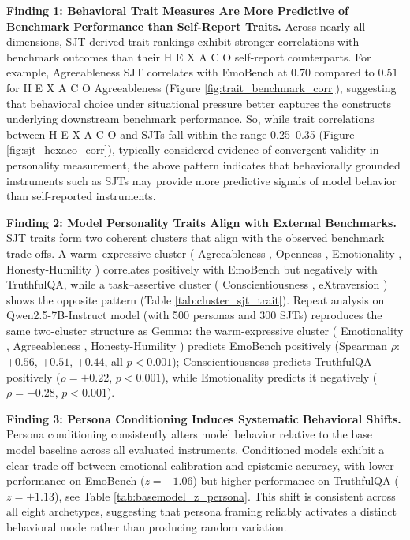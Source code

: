 \documentclass[11pt]{article}
\newcommand{\hexaco}{%
  {\textcolor{hexH}{H}}%
  {\textcolor{hexE}{E}}%
  {\textcolor{hexX}{X}}%
  {\textcolor{hexA}{A}}%
  {\textcolor{hexC}{C}}%
  {\textcolor{hexO}{O}}%
}
\newcommand{\honestyhumility}{%
  {\textcolor{hexH}{Honesty-Humility}}%
}
\newcommand{\emotionality}{%
  {\textcolor{hexE}{Emotionality}}%
}
\newcommand{\extraversion}{%
  {\textcolor{hexX}{eXtraversion}}%
}
\newcommand{\agreeableness}{%
  {\textcolor{hexA}{Agreeableness}}%
}
\newcommand{\conscientiousness}{%
  {\textcolor{hexC}{Conscientiousness}}%
}
\newcommand{\openness}{%
  {\textcolor{hexO}{Openness}}%
}
\begin{document}
\noindent\textbf{Finding 1: Behavioral Trait Measures Are More Predictive of Benchmark Performance than Self-Report Traits.}
Across nearly all dimensions, SJT-derived trait rankings exhibit stronger correlations with benchmark outcomes than their \hexaco\; self-report counterparts. For example, \agreeableness\; SJT correlates with EmoBench at $0.70$ compared to $0.51$ for \hexaco\; \agreeableness\; (Figure \ref{fig:trait_benchmark_corr}), suggesting that behavioral choice under situational pressure better captures the constructs underlying downstream benchmark performance. So, while trait correlations between \hexaco\; and SJTs fall within the range 0.25–0.35 (Figure \ref{fig:sjt_hexaco_corr}), typically considered evidence of convergent validity in personality measurement, the above pattern indicates that behaviorally grounded instruments such as SJTs may provide more predictive signals of model behavior than self-reported instruments.

\noindent\textbf{Finding 2: Model Personality Traits Align with External Benchmarks.}
SJT traits form two coherent clusters that align with the observed benchmark trade-offs. A warm–expressive cluster (\agreeableness\;, \openness\;, \emotionality\;, \honestyhumility\;) correlates positively with EmoBench but negatively with TruthfulQA, while a task–assertive cluster (\conscientiousness\;, \extraversion\;) shows the opposite pattern (Table \ref{tab:cluster_sjt_trait}). Repeat analysis on Qwen2.5-7B-Instruct \citep{qwen2025qwen25technicalreport} model (with 500 personas and 300 SJTs) reproduces the same two-cluster structure as Gemma: the warm-expressive cluster (\emotionality\;, \agreeableness\;, \honestyhumility\;) predicts EmoBench positively (Spearman $\rho$: $+0.56$, $+0.51$, $+0.44$, all $p<0.001$); \conscientiousness{} predicts TruthfulQA positively ($\rho = +0.22$, $p<0.001$), while
\emotionality{} predicts it negatively ($\rho = -0.28$, $p<0.001$).


\noindent\textbf{Finding 3: Persona Conditioning Induces Systematic Behavioral Shifts.}
Persona conditioning consistently alters model behavior relative to the base model baseline across all evaluated instruments. Conditioned models exhibit a clear trade-off between emotional calibration and epistemic accuracy, with lower performance on EmoBench ($z=-1.06$) but higher performance on TruthfulQA ($z=+1.13$), see Table \ref{tab:basemodel_z_persona}. This shift is consistent across all eight archetypes, suggesting that persona framing reliably activates a distinct behavioral mode rather than producing random variation.
\end{document}
